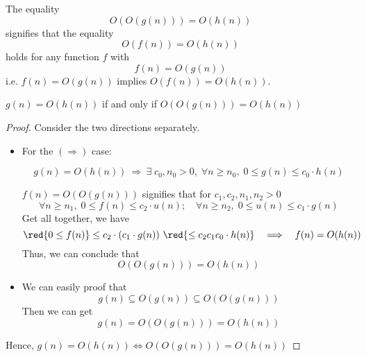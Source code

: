 \begin{definition}
    The equality \[
        O(O(g(n))) = O(h(n))
    \]
    signifies that the equality
    \[
        O(f(n)) = O(h(n))
    \]
    holds for any function $f$ with \[
        f(n) = O(g(n))
    \]
    i.e. $f(n) = O(g(n))$ implies $O(f(n)) = O(h(n))$.
\end{definition}

\begin{theorem}
    $g(n) = O(h(n))$ if and only if $O(O(g(n))) = O(h(n))$
\end{theorem}
\begin{proof}
    Consider the two directions separately.
    \begin{itemize}
        \item For the $(\Rightarrow)$ case: 
        \begin{prev}
            \[
            g(n) = O(h(n)) \ \Longrightarrow \ \exists \; c_0, n_0 > 0, \; \forall n \geq n_0, \; 0 \leq g(n) \leq c_0 \cdot h(n)
            \]
        \end{prev}
        \(f(n) = O(O(g(n)))\) signifies that for \( c_1, c_2, n_1, n_2 > 0 \)
        \[
            \forall n \geq n_1, \; 0 \leq f(n) \leq c_2 \cdot u(n); \quad \forall n \geq n_2, \; 0 \leq u(n) \leq c_1 \cdot g(n)
        \]
        Get all together, we have
        \[
            \red{0 \leq f(n)} \leq c_2 \cdot (c_1 \cdot g(n))\  \red{\leq c_2 c_1 c_0 \cdot h(n)} \quad \Longrightarrow \quad f(n) = O(h(n))
        \]
        Thus, we can conclude that \[
            O(O(g(n))) = O(h(n))
        \]

        \item We can easily proof that \[
            g(n) \subseteq O(g(n)) \subseteq O(O(g(n)))
        \]
        Then we can get \[
            g(n) = O(O(g(n))) = O(h(n))
        \]
    \end{itemize}
    Hence, \( g(n) = O(h(n)) \iff O(O(g(n))) = O(h(n))\)
\end{proof}

